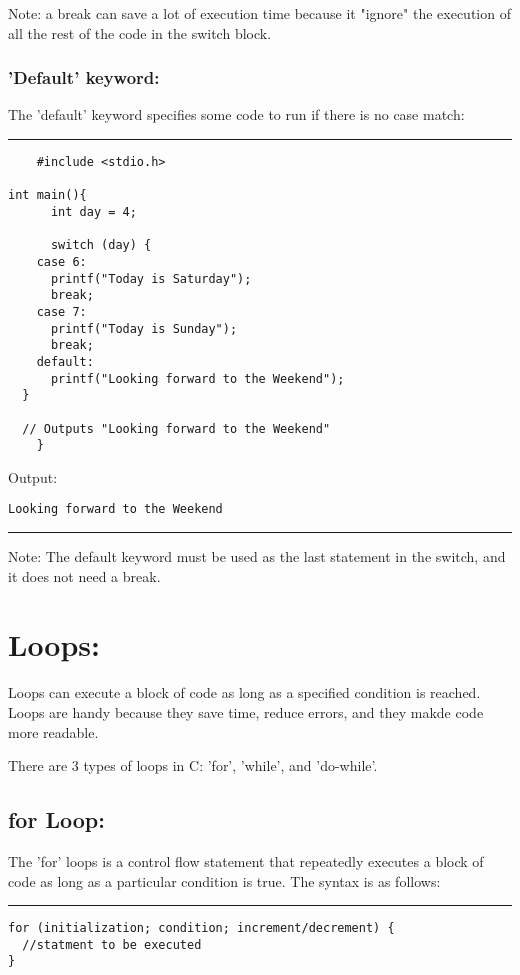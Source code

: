 \documentclass[a4paper]{article}
\begin{document}
Note: a break can save a lot of execution time because it "ignore" the execution
of all the rest of the code in the switch block.
\subsubsection{'Default' keyword:}
\label{sec:org8705d05}
The 'default' keyword specifies some code to run if there is no case match:

\noindent\rule{\textwidth}{0.5pt}
\begin{verbatim}
    #include <stdio.h>

int main(){
      int day = 4;

      switch (day) {
    case 6:
      printf("Today is Saturday");
      break;
    case 7:
      printf("Today is Sunday");
      break;
    default:
      printf("Looking forward to the Weekend");
  }

  // Outputs "Looking forward to the Weekend"
    }
\end{verbatim}
Output:
\begin{verbatim}
Looking forward to the Weekend
\end{verbatim}

\noindent\rule{\textwidth}{0.5pt}
Note: The default keyword must be used as the last statement in the switch, and
it does not need a break.

\section{Loops:}
\label{sec:orgab72111}
Loops can execute a block of code as long as a specified condition is reached.
Loops are handy because they save time, reduce errors, and they makde code more
readable.

There are 3 types of loops in C: 'for', 'while', and 'do-while'.

\subsection{for Loop:}
\label{sec:orge944910}
The 'for' loops is a control flow statement that repeatedly executes a block of
code as long as a particular condition is true. The syntax is as follows:

\noindent\rule{\textwidth}{0.5pt}
\begin{verbatim}
for (initialization; condition; increment/decrement) {
  //statment to be executed
}
\end{verbatim}
\end{document}
